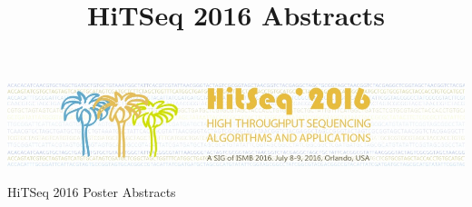 \documentclass[11pt]{article}
\date{}
\author{}
\title{
  HiTSeq 2016 Abstracts
}
\begin{document}

\begin{center}
\includegraphics[scale=0.5]{hitseq_banner.jpg}

\vspace*{5cm}
\Huge{HiTSeq 2016 Poster Abstracts}
\end{center}

\newpage


  \clearpage 
  \clearpage 
  \clearpage 
  \clearpage 
  \clearpage 
  \clearpage 
  \clearpage 
\end{document}

